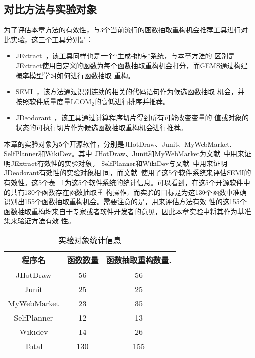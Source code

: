 \subsection{对比方法与实验对象}
为了评估本章方法的有效性，与3个当前流行的函数抽取重构机会推荐工具进行对比实验，这三个工具分别是：
\begin{itemize}
  \item JExtract~\cite{silva:ICPC14,silva:CoRR15}，该工具同样也是一个``生成-排序''系统，与本章方法的
区别是JExtract使用自定义的函数为每个函数抽取重构机会打分，而GEMS通过构建概率模型学习如何进行函数抽取
重构。
  \item SEMI~\cite{charalampidou2016identifying}，该方法通过识别连续的相关的代码语句作为候选函数抽取
机会，并按照软件质量度量LCOM$_2$的高低进行排序并推荐。
  \item JDeodorant~\cite{tsantalis2011identification}，该工具通过计算程序切片得到所有可能改变变量的
  值或对象的状态的可执行切片作为候选函数抽取重构机会进行推荐。
\end{itemize}

本章的实验对象为5个开源软件，分别是JHotDraw、Junit、MyWebMarket、SelfPlanner和WikiDev。其中
JHotDraw、Junit和MyWebMarket为文献~\cite{silva:ICPC14}中用来证明JExtract有效性的实验对象，
SelfPlanner和WikiDev与文献~\cite{tsantalis2011identification}中用来证明JDeodorant有效性的实验对象相
同，而文献~\cite{charalampidou2016identifying}使用了这5个软件系统来评估SEMI的有效性。这5个表
~\ref{benchmark}为这5个软件系统的统计信息。可以看到，在这5个开源软件中的共有130个函数存在函数抽取重
构操作，而实验的目标是为这130个函数中准确识别出155个函数抽取重构机会。需要注意的是，用来评估方法有效
性的这155个函数抽取重构均来自于专家或者软件开发者的意见，因此本章实验中将其作为基准集来验证方法有效
性。

\begin{table}[!t]
  \scriptsize
  \renewcommand{\arraystretch}{1.3}
  \caption{实验对象统计信息}
  \label{benchmark}
  \centering
  \begin{tabular}{ccc}
  \toprule 
  程序名 &函数数量 &函数抽取重构数量.\\ \midrule
  JHotDraw &56 &56 \\ 
  Junit &25 &25 \\ 
  MyWebMarket &23 &35 \\ 
  SelfPlanner &12 &13 \\ 
  Wikidev &14 &26 \\ \midrule
  Total &130 &155 \\ 
  \bottomrule
  \end{tabular}
  \end{table}

